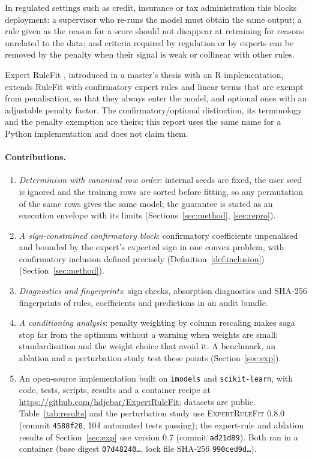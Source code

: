\documentclass[11pt,a4paper]{article}
\theoremstyle{definition}\newtheorem{definition}{Definition}
\begin{document}
In regulated settings such as credit, insurance or tax administration this blocks deployment: a supervisor who re-runs the model must obtain the same output; a rule given as the reason for a score should not disappear at retraining for reasons unrelated to the data; and criteria required by regulation or by experts can be removed by the penalty when their signal is weak or collinear with other rules.

Expert RuleFit \citep{ebner_erf,ebner2021ws}, introduced in a master's thesis \citep[p.~XII]{nalenz2021} with an R implementation, extends RuleFit with confirmatory expert rules and linear terms that are exempt from penalisation, so that they always enter the model, and optional ones with an adjustable penalty factor. The confirmatory/optional distinction, its terminology and the penalty exemption are theirs; this report uses the same name for a Python implementation and does not claim them.

\paragraph{Contributions.}
\begin{enumerate}
  \item \emph{Determinism with canonical row order}: internal seeds are fixed, the user seed is ignored and the training rows are sorted before fitting, so any permutation of the same rows gives the same model; the guarantee is stated as an execution envelope with its limits (Sections~\ref{sec:method}, \ref{sec:repro}).
  \item \emph{A sign-constrained confirmatory block}: confirmatory coefficients unpenalised and bounded by the expert's expected sign in one convex problem, with confirmatory inclusion defined precisely (Definition~\ref{def:inclusion}) (Section~\ref{sec:method}).
  \item \emph{Diagnostics and fingerprints}: sign checks, absorption diagnostics and SHA-256 fingerprints of rules, coefficients and predictions in an audit bundle.
  \item \emph{A conditioning analysis}: penalty weighting by column rescaling makes saga stop far from the optimum without a warning when weights are small; standardisation and the weight choice that avoid it. A benchmark, an ablation and a perturbation study test these points (Section~\ref{sec:exp}).
  \item An open-source implementation built on \texttt{imodels} \citep{singh2021} and \texttt{scikit-learn}, with code, tests, scripts, results and a container recipe at \url{https://github.com/hdjebar/ExpertRuleFit}; datasets are public. Table~\ref{tab:results} and the perturbation study use \textsc{ExpertRuleFit} 0.8.0 (commit \texttt{4588f20}, 104 automated tests passing); the expert-rule and ablation results of Section~\ref{sec:exp} use version 0.7 (commit \texttt{ad21d89}). Both ran in a container (base digest \texttt{07d48240\ldots}, lock file SHA-256 \texttt{990ced9d\ldots}).
\end{enumerate}
\end{document}
